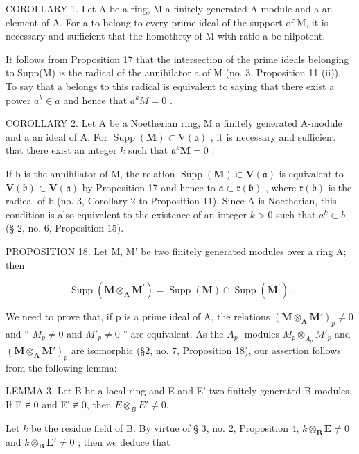 COROLLARY 1. Let A be a ring, M a finitely generated A-module and a an element of A. For a to belong to every prime ideal of the support of M, it is necessary and sufficient that the homothety of M with ratio a be nilpotent.

It follows from Proposition 17 that the intersection of the prime ideals belonging to Supp(M) is the radical of the annihilator a of M (no. 3, Proposition 11 (ii)). To say that a belongs to this radical is equivalent to saying that there exist a power \(a^{k} \in a\) and hence that \(a^{k}M = 0\) .

COROLLARY 2. Let A be a Noetherian ring, M a finitely generated A-module and a an ideal of A. For \(\operatorname{Supp}(\mathbf{M}) \subset \mathrm{V}(\mathfrak{a})\) , it is necessary and sufficient that there exist an integer \(k\) such that \(\mathfrak{a}^k\mathbf{M} = 0\) .

If b is the annihilator of M, the relation \(\operatorname{Supp}(\mathbf{M}) \subset \mathbf{V}(\mathfrak{a})\) is equivalent to \(\mathbf{V}(\mathfrak{b}) \subset \mathbf{V}(\mathfrak{a})\) by Proposition 17 and hence to \(\mathfrak{a} \subset \mathfrak{r}(\mathfrak{b})\) , where \(\mathfrak{r}(\mathfrak{b})\) is the radical of b (no. 3, Corollary 2 to Proposition 11). Since A is Noetherian, this condition is also equivalent to the existence of an integer \(k > 0\) such that \(a^{k} \subset b\) (§ 2, no. 6, Proposition 15).

PROPOSITION 18. Let M, M' be two finitely generated modules over a ring A; then

\[
\operatorname{Supp} (\mathbf {M} \otimes_ {\mathbf {A}} \mathbf {M} ^ {\prime}) = \operatorname{Supp} (\mathbf {M}) \cap \operatorname{Supp} (\mathbf {M} ^ {\prime}).\tag{10}
\]

We need to prove that, if p is a prime ideal of A, the relations \((\mathbf{M} \otimes_{\mathbf{A}} \mathbf{M}')_{p} \neq 0\) and `` \(M_{p} \neq 0\) and \(M'_{p} \neq 0\) '' are equivalent. As the \(A_{p}\) -modules \(M_{p} \otimes_{A_{p}} M'_{p}\) and \((\mathbf{M} \otimes_{\mathbf{A}} \mathbf{M}')_{p}\) are isomorphic (§2, no. 7, Proposition 18), our assertion follows from the following lemma:

LEMMA 3. Let B be a local ring and E and E' two finitely generated B-modules. If E ≠ 0 and E' ≠ 0, then \(E \otimes_{B} E' \neq 0\).

Let \(k\) be the residue field of B. By virtue of § 3, no. 2, Proposition 4, \(k \otimes_{\mathbf{B}} \mathbf{E} \neq 0\) and \(k \otimes_{\mathbf{B}} \mathbf{E}' \neq 0\) ; then we deduce that

